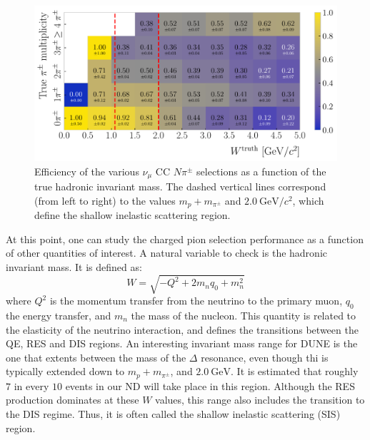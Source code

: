 \begin{figure}[t]
    \centering
    \includegraphics[width=.90\linewidth]{Images/GAr_selection/pion_selection_efficiency_versus_invariant_mass.pdf}
    \caption[Efficiency of the $\nu_{\mu}$ CC $N\pi^{\pm}$ selections as a function of the hadronic invariant mass.]{Efficiency of the various $\nu_{\mu}$ CC $N\pi^{\pm}$ selections as a function of the true hadronic invariant mass. The dashed vertical lines correspond (from left to right) to the values $m_{p}+m_{\pi^{\pm}}$ and $2.0~\mathrm{GeV}/c^{2}$, which define the shallow inelastic scattering region.}
    \label{fig:efficiency_vs_invariant_mass}
\end{figure}

At this point, one can study the charged pion selection performance as a function of other quantities of interest. A natural variable to check is the hadronic invariant mass. It is defined as:
\begin{equation}
W = \sqrt{-Q^{2} + 2 m_{n} q_{0} + m_{n}^{2}}
\end{equation}
where $Q^{2}$ is the momentum transfer from the neutrino to the primary muon, $q_{0}$ the energy transfer, and $m_{n}$ the mass of the nucleon. This quantity is related to the elasticity of the neutrino interaction, and defines the transitions between the QE, RES and DIS regions. An interesting invariant mass range for DUNE is the one that extents between the mass of the $\Delta$ resonance, even though thi is typically extended down to $m_{p}+m_{\pi^{\pm}}$, and $2.0~\mathrm{GeV}$. It is estimated that roughly $7$ in every $10$ events in our ND will take place in this region. Although the RES production dominates at these $W$ values, this range also includes the transition to the DIS regime. Thus, it is often called the shallow inelastic scattering (SIS) region.

